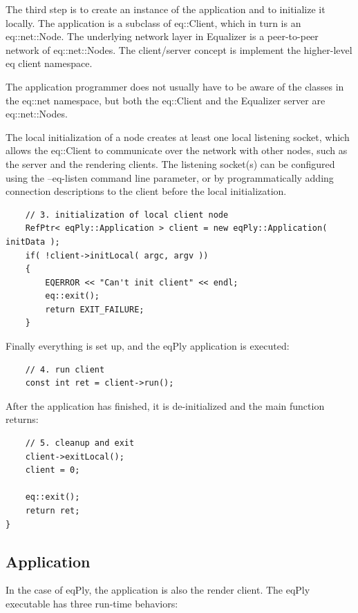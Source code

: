 \documentclass[10pt,a4]{scrartcl}
\begin{document}
The third step is to create an instance of the application and to
initialize it locally. The application is a subclass of
\textsf{eq::Client}, which in turn is an \textsf{eq::net::Node}. The
underlying network layer in Equalizer is a peer-to-peer network of
\textsf{eq::net::Node}s. The client/server concept is implement the
higher-level \textsf{eq} client namespace.

The application programmer does not usually have to be aware of the
classes in the \textsf{eq::net} namespace, but both the
\textsf{eq::Client} and the Equalizer server are
\textsf{eq::net::Node}s.

The local initialization of a node creates at least one local listening
socket, which allows the \textsf{eq::Client} to communicate over the
network with other nodes, such as the server and the rendering
clients. The listening socket(s) can be configured using the
\textsf{--eq-listen} command line parameter, or by programmatically
adding connection descriptions to the client before the local
initialization.

{\footnotesize\begin{lstlisting}
    // 3. initialization of local client node
    RefPtr< eqPly::Application > client = new eqPly::Application( initData );
    if( !client->initLocal( argc, argv ))
    {
        EQERROR << "Can't init client" << endl;
        eq::exit();
        return EXIT_FAILURE;
    }
\end{lstlisting}}%

Finally everything is set up, and the \textsf{eqPly} application is executed:

{\footnotesize\begin{lstlisting}
    // 4. run client
    const int ret = client->run();
\end{lstlisting}}

After the application has finished, it is de-initialized and the
\textsf{main} function returns:

{\footnotesize\begin{lstlisting}
    // 5. cleanup and exit
    client->exitLocal();
    client = 0;

    eq::exit();
    return ret;
}
\end{lstlisting}}


\subsection{Application}

In the case of \textsf{eqPly}, the application is also the render
client. The \textsf{eqPly} executable has three run-time behaviors:
\end{document}
